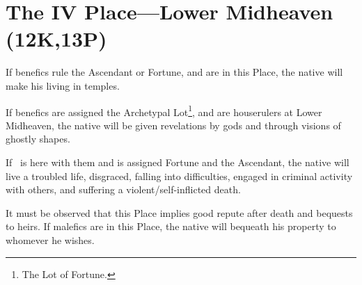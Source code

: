 \section{The IV Place---Lower Midheaven (12K,13P)}
If benefics rule the Ascendant or Fortune, and are in this Place, the native will make his living in temples. 

If benefics are assigned the Archetypal Lot\footnote{The Lot of Fortune.}, and are houserulers at Lower Midheaven, the native will be given revelations by gods and through visions of ghostly shapes. 

If \Mars\, is here with them and is assigned Fortune and the Ascendant, the native will live a troubled life, disgraced, falling into difficulties,
engaged in criminal activity with others, and suffering a violent/self-inflicted death.

It must be observed that this Place implies good repute after death and bequests to heirs. If malefics are in this Place, the native will bequeath his property to whomever he wishes.

\newpage